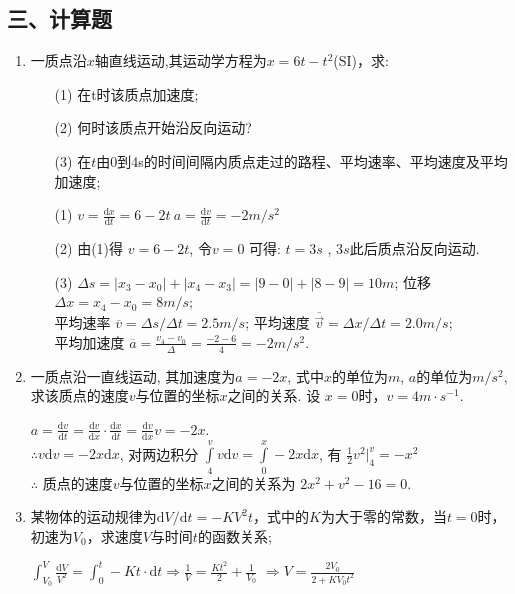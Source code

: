 \subsection*{三、计算题}
\begin{enumerate}
    \item 一质点沿$x$轴直线运动,其运动学方程为$x=6t-t^2$(SI)，求:
    \begin{enumerate}
        \item[(1)] 在t时该质点加速度;
        \item[(2)] 何时该质点开始沿反向运动?
        \item[(3)] 在$t$由0到4s的时间间隔内质点走过的路程、平均速率、平均速度及平均加速度;
    \end{enumerate}
    \begin{solution}
        \begin{enumerate}
            \item[(1)]  $v=\frac{\mathrm{d}x}{\mathrm{d}t}=6-2t\ a=\frac{\mathrm{d}v}{\mathrm{d}t}=-2 m/s^2$
            \item[(2)]  由(1)得 $v=6-2t$, 令$v=0$ 可得: $t=3s$ , $3s$此后质点沿反向运动.
            \item[(3)]  $\Delta s = |x_3-x_0|+|x_4-x_3|=|9-0|+|8-9|=10 m $;   位移 $\Delta x = x_4-x_0=8 m/s$;\\
                    平均速率 $\overline{v}=\Delta s/ \Delta t=2.5 m/s$; 平均速度 $\overline{\vec{v}}=\Delta x / \Delta t = 2.0 m/s$;\\ 
                  平均加速度 $\overline{a}=\frac{v_4-v_0}{\Delta}=\frac{-2-6}{4}=-2 m/s^2$.
        
        \end{enumerate}
       
    \end{solution}
    \item 一质点沿一直线运动, 其加速度为$a=-2x$, 式中$x$的单位为$m$, $a$的单位为$m/s^2$, 
    求该质点的速度$v$与位置的坐标$x$之间的关系. 设 $x=0$时，$v=4m\cdot s^{-1}$.
    \begin{solution}
        $a=\frac{\mathrm{d}v}{\mathrm{d}t}=\frac{\mathrm{d}v}{\mathrm{d}x}\cdot \frac{\mathrm{d}x}{\mathrm{d}t}=\frac{\mathrm{d}v}{\mathrm{d}x}v=-2x$. \\
        $\therefore v\mathrm{d}v = -2x\mathrm{d}x$, 对两边积分 $\displaystyle{\int\limits_4^v v\mathrm{d}v = \int\limits_0^x -2x \mathrm{d}x}$, 有 $\frac{1}{2}v^2 |_4^v = -x^2$\\
        $\therefore$ 质点的速度$v$与位置的坐标$x$之间的关系为 $2x^2+v^2-16 = 0$.
    \end{solution}
    \item  某物体的运动规律为$\mathrm{d}V/\mathrm{d}t=-KV^2t$，式中的$K$为大于零的常数，当$t=0$时，初速为$V_0$，求速度$V$与时间$t$的函数关系; 
    \begin{solution}
        $\displaystyle{\int_{V_0}^{V}\frac{\mathrm{d}V}{V^2}=\int_{0}^{t} -Kt \cdot \mathrm{d}t\Longrightarrow \frac{1}{V} = \frac{Kt^2}{2}+\frac{1}{V_0}}$
        $\Longrightarrow V=\frac{2V_0}{2+KV_0t^2}$
    \end{solution}
\end{enumerate}